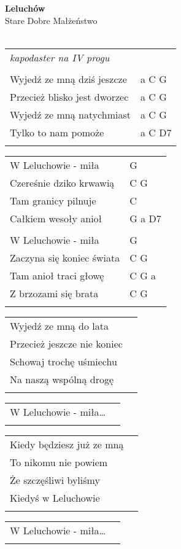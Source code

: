 \documentclass[a5paper]{article}
\begin{document}


\noindent
\fontsize{12pt}{15pt}\selectfont
\textbf{Leluchów} \\
\fontsize{8pt}{10pt}\selectfont
Stare Dobre Małżeństwo \\ \\
\fontsize{10pt}{12pt}\selectfont
{}
\begin{tabular}{@{}p{8.00cm}p{3cm}@{}}
\noindent
\emph{kapodaster na IV progu} \\ \\

Wyjedź ze mną dziś jeszcze & a C G \\
Przecież blisko jest dworzec & a C G \\
Wyjedź ze mną natychmiast & a C G \\
Tylko to nam pomoże & a C D7 \\ \\
\end{tabular}

\begin{tabular}{@{}p{6.50cm}p{3cm}@{}}
\noindent
W Leluchowie - miła & G \\
Czereśnie dziko krwawią & C G \\
Tam granicy pilnuje & C \\
Całkiem wesoły anioł & G a D7 \\ \\

W Leluchowie - miła & G \\
Zaczyna się koniec świata & C G \\
Tam anioł traci głowę & C G a \\
Z brzozami się brata & C G \\ \\
\end{tabular}

\begin{tabular}{@{}p{8.00cm}p{3cm}@{}}
\noindent
Wyjedź ze mną do lata \\
Przecież jeszcze nie koniec \\
Schowaj trochę uśmiechu \\
Na naszą wspólną drogę \\ \\
\end{tabular}

\begin{tabular}{@{}p{8.00cm}p{3cm}@{}}
\noindent
W Leluchowie - miła… \\ \\
\end{tabular}

\begin{tabular}{@{}p{8.00cm}p{3cm}@{}}
\noindent
Kiedy będziesz już ze mną \\
To nikomu nie powiem \\
Że szczęśliwi byliśmy \\ 
Kiedyś w Leluchowie \\ \\
\end{tabular}

\begin{tabular}{@{}p{8.00cm}p{3cm}@{}}
\noindent
W Leluchowie - miła… \\ \\
\end{tabular}
\end{document}
